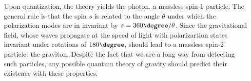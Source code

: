 Upon quantization, the theory yields the photon, a massless spin-1 particle.
The general rule is that the spin $s$ is related to the angle $\theta$ under which the polarization modes are in invariant by $s = 360 \degree /\theta$.
Since the gravitational field, whose waves propagate at the speed of light with polarizartion states invariant under rotations of $180 \degree$, should lead to a massless spin-2 particle: the graviton.
Despite the fact that we are a long way from detecting such particles, any possible quantum theory of gravity should predict their existence with these properties.



